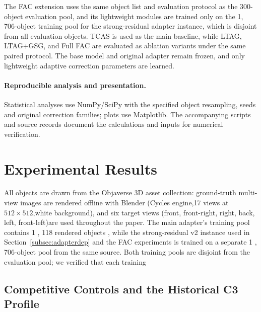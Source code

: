 \documentclass[times,twocolumn,final]{elsarticle}
\providecommand{\DIFadd}[1]{{\protect\color{blue} \sf #1}} %
\providecommand{\DIFdel}[1]{{\protect\color{red} \scriptsize #1}} %
\providecommand{\DIFaddbegin}{} %
\providecommand{\DIFaddend}{} %
\providecommand{\DIFdelbegin}{} %
\providecommand{\DIFdelend}{} %
\begin{document}
\DIFdelbegin \DIFdel{The FAC extension uses the same object list and evaluation protocol as the 300-object evaluation pool, and its lightweight modules are trained only on the 1, 706-object training pool for the strong-residual adapter instance, which is disjoint from all evaluation objects. TCAS is used as the main baseline, while LTAG, LTAG+GSG, and Full FAC are evaluated as ablation variants under the same paired protocol. The base model and original adapter remain frozen, and only lightweight adaptive correction parameters are learned. }\DIFdelend \DIFaddbegin \paragraph{Reproducible analysis and presentation.}
\DIFadd{Statistical analyses use NumPy/SciPy with the specified object resampling, seeds and original correction families; plots use Matplotlib. The accompanying scripts and source records document the calculations and inputs for numerical verification.
}\DIFaddend 

\DIFdelbegin %
\DIFdelend \DIFaddbegin \section{Experimental Results}
\label{sec:experiments}
\DIFaddend 

\DIFdelbegin \DIFdel{All objects are drawn from the Objaverse 3D asset collection: ground-truth multi-view images are rendered offline with Blender (Cycles engine,17 views at $512\times512$,white background), and six target views (front, front-right, right, back, left, front-left)are used throughout the paper. The main adapter's training pool contains 1}%
\DIFdel{,}%
\DIFdel{118 rendered objects , while the strong-residual v2 instance used in Section~\ref{subsec:adapterdep} and the FAC experiments is trained on a separate 1}%
\DIFdel{, }%
\DIFdel{706-object pool from the same source. Both training pools are disjoint from the evaluation pool; we verified that each training}\DIFdelend \DIFaddbegin \subsection{Competitive Controls and the Historical C3 Profile}
\label{subsec:largescale}
\end{document}
